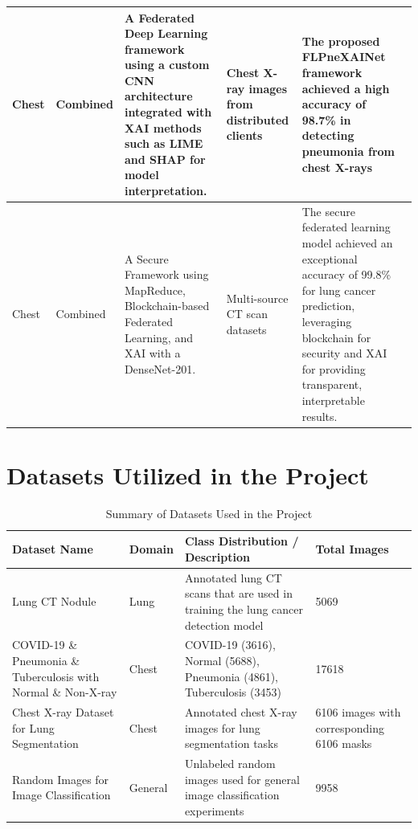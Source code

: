 \begin{center}
\begin{longtable}{|p{1cm}|p{1.5cm}|p{2cm}|p{1.8cm}|p{5cm}|p{1.2cm}|}
		\hline
		Chest & Combined & A Federated Deep Learning framework using a custom CNN architecture integrated with XAI methods such as LIME and SHAP for model interpretation. & Chest X-ray images from distributed clients & The proposed FLPneXAINet framework achieved a high accuracy of 98.7\% in detecting pneumonia from chest X-rays & \cite{ref38} \\
		\hline
		Chest & Combined & A Secure Framework using MapReduce, Blockchain-based Federated Learning, and XAI with a DenseNet-201. & Multi-source CT scan datasets & The secure federated learning model achieved an exceptional accuracy of 99.8\% for lung cancer prediction, leveraging blockchain for security and XAI for providing transparent, interpretable results. & \cite{ref39} \\ \hline
	\end{longtable}
\end{center}

\section{Datasets Utilized in the Project}

\begin{table}[h]
	\centering
	\caption{Summary of Datasets Used in the Project}
	\label{tab:datasets}
	\renewcommand{\arraystretch}{1.3}
	\begin{tabular}{|p{3cm}|p{2cm}|p{7.5cm}|p{2.5cm}|}
		\hline
		\textbf{Dataset Name} & \textbf{Domain} & \textbf{Class Distribution / Description} & \textbf{Total Images} \\
		\hline
		Lung CT Nodule & Lung &
		Annotated lung CT scans that are used in training the lung cancer detection model&
		\num{5069} \\
		\hline
		COVID-19 \& Pneumonia \& Tuberculosis with Normal \& Non-X-ray &
		Chest &
		COVID-19 (\num{3616}), Normal (\num{5688}), Pneumonia (\num{4861}), Tuberculosis (\num{3453}) &
		\num{17618} \\
		\hline
		Chest X-ray Dataset for Lung Segmentation &
		Chest &
		Annotated chest X-ray images for lung segmentation tasks &
		\num{6106} images with corresponding \num{6106} masks \\
		\hline
		Random Images for Image Classification &
		General &
		Unlabeled random images used for general image classification experiments &
		\num{9958} \\
		\hline
	\end{tabular}
\end{table}



